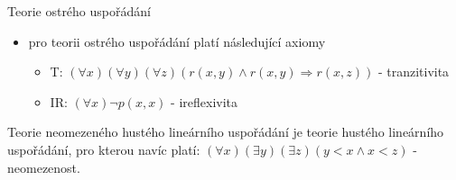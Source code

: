 \documentclass{szzclass}
\begin{document}
Teorie ostrého uspořádání
\begin{itemize}
  \item pro teorii ostrého uspořádání platí následující axiomy
  \begin{itemize}
    \item T: $(\forall{x})(\forall{y})(\forall{z})(r(x,y) \wedge r(x,y) \Rightarrow r(x,z))$ - tranzitivita
    \item IR: $(\forall{x})\neg p(x,x)$ - ireflexivita
  \end{itemize}
\end{itemize}
Teorie neomezeného hustého lineárního uspořádání je teorie hustého lineárního uspořádání, pro kterou navíc platí:
$(\forall{x})(\exists{y})(\exists{z})(y < x \wedge x < z)$ - neomezenost.
\end{document}
